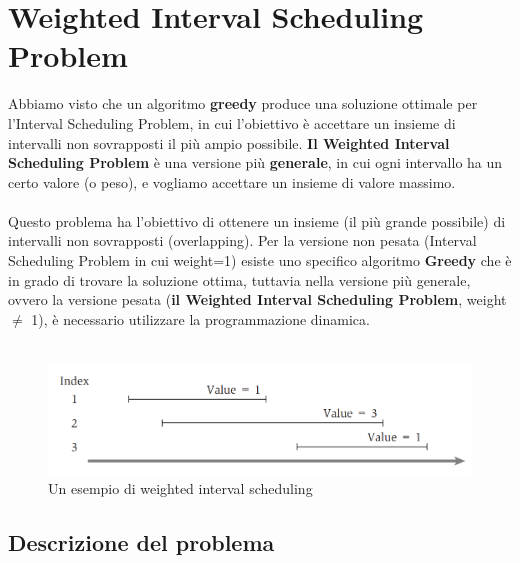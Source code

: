 \chapter{Weighted Interval Scheduling
  Problem}

Abbiamo visto che un algoritmo \textbf{greedy} produce una soluzione
ottimale per l'Interval Scheduling Problem, in cui l'obiettivo è
accettare un insieme di intervalli non sovrapposti il più ampio
possibile. \textbf{Il Weighted Interval Scheduling Problem} è una
versione più \textbf{generale}, in cui ogni intervallo ha un certo
valore (o peso), e vogliamo accettare un insieme di valore massimo.
\\
\\
Questo problema ha l'obiettivo di ottenere un insieme (il più grande
possibile) di intervalli non sovrapposti (overlapping). Per la versione
non pesata (Interval Scheduling Problem in cui weight=1) esiste uno
specifico algoritmo \textbf{Greedy} che è in grado di trovare la
soluzione ottima, tuttavia nella versione più generale, ovvero la
versione pesata (\textbf{il Weighted Interval Scheduling Problem},
weight $\neq$ 1), è necessario utilizzare la programmazione dinamica.
\\
\\


\begin{figure}[H]
      \includegraphics[width=\textwidth]{capitoli/programmazione_dinamica/imgs/weigted_interval_scheduling.png}
      \centering
      \caption{Un esempio di weighted interval scheduling}
\end{figure}


\section{Descrizione del problema}

